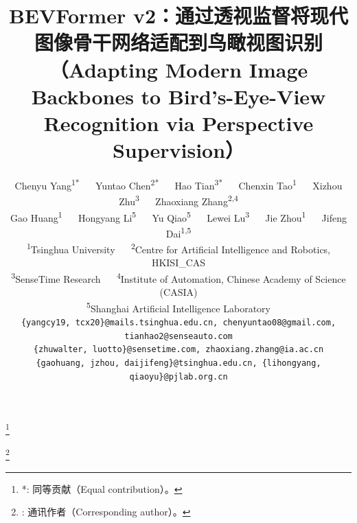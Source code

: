 \documentclass[10pt,twocolumn,letterpaper]{article}
\newcommand\blfootnote[1]{%
  \begingroup
  \renewcommand\thefootnote{}\footnote{#1}%
  \addtocounter{footnote}{-1}%
  \endgroup
}
\begin{document}
\title{BEVFormer v2：通过透视监督将现代图像骨干网络适配到鸟瞰视图识别（Adapting Modern Image Backbones to Bird's-Eye-View Recognition via Perspective Supervision）}

\author{Chenyu Yang\textsuperscript{\rm 1*} ~~ 
Yuntao Chen\textsuperscript{\rm 2*} ~~ 
Hao Tian\textsuperscript{\rm 3*} ~~ 
Chenxin Tao\textsuperscript{\rm 1} ~~ 
Xizhou Zhu\textsuperscript{\rm 3} ~~ 
Zhaoxiang Zhang\textsuperscript{\rm 2,4} \\
Gao Huang\textsuperscript{\rm 1} ~~ 
Hongyang Li\textsuperscript{\rm 5} ~~
Yu Qiao\textsuperscript{\rm 5} ~~
Lewei Lu\textsuperscript{\rm 3} ~~ 
Jie Zhou\textsuperscript{\rm 1} ~~
Jifeng Dai\textsuperscript{\rm 1,5\Letter}
\\ [0.15cm]
\textsuperscript{\rm 1}Tsinghua University ~~ 
\textsuperscript{\rm 2}Centre for Artificial Intelligence and Robotics, HKISI\_CAS \\ 
\textsuperscript{\rm 3}SenseTime Research ~~
\textsuperscript{\rm 4}Institute of Automation, Chinese Academy of Science (CASIA) \\
\textsuperscript{\rm 5}Shanghai Artificial Intelligence Laboratory
\\ [0.15cm]
{\tt\small \{yangcy19, tcx20\}@mails.tsinghua.edu.cn, chenyuntao08@gmail.com, tianhao2@senseauto.com}\\
{\tt\small \{zhuwalter, luotto\}@sensetime.com, zhaoxiang.zhang@ia.ac.cn}\\
{\tt\small \{gaohuang, jzhou, daijifeng\}@tsinghua.edu.cn, \{lihongyang, qiaoyu\}@pjlab.org.cn}
}

\maketitle


\blfootnote{*: 同等贡献（Equal contribution）。}
\blfootnote{\Letter: 通讯作者（Corresponding author）。}



%




{\small


}

\appendix

\end{document}
